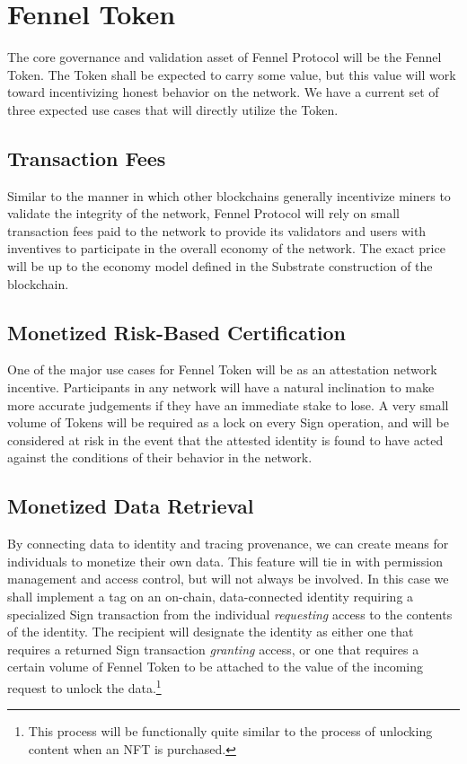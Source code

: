 \documentclass[]{article}
\begin{document}
\section{Fennel Token}
\label{scrivauto:28}

The core governance and validation asset of Fennel Protocol will be the Fennel Token. The Token shall be expected to carry some value, but this value will work toward incentivizing honest behavior on the network. We have a current set of three expected use cases that will directly utilize the Token.

\subsection{Transaction Fees}
\label{scrivauto:29}

Similar to the manner in which other blockchains generally incentivize miners to validate the integrity of the network, Fennel Protocol will rely on small transaction fees paid to the network to provide its validators and users with inventives to participate in the overall economy of the network. The exact price will be up to the economy model defined in the Substrate construction of the blockchain.

\subsection{Monetized Risk-Based Certification}
\label{scrivauto:30}

One of the major use cases for Fennel Token will be as an attestation network incentive. Participants in any network will have a natural inclination to make more accurate judgements if they have an immediate stake to lose. A very small volume of Tokens will be required as a lock on every Sign operation, and will be considered at risk in the event that the attested identity is found to have acted against the conditions of their behavior in the network.

\subsection{Monetized Data Retrieval}
\label{scrivauto:31}

By connecting data to identity and tracing provenance, we can create means for individuals to monetize their own data. This feature will tie in with permission management and access control, but will not always be involved. In this case we shall implement a tag on an on-chain, data-connected identity requiring a specialized Sign transaction from the individual \textit{requesting }access to the contents of the identity. The recipient will designate the identity as either one that requires a returned Sign transaction \textit{granting }access, or one that requires a certain volume of Fennel Token to be attached to the value of the incoming request to unlock the data.\footnote{This process will be functionally quite similar to the process of unlocking content when an NFT is purchased.}
\end{document}

